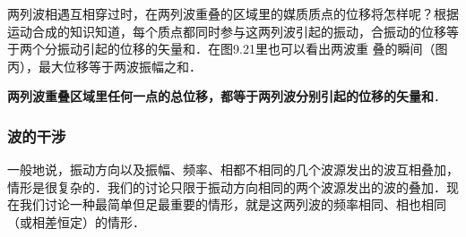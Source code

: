 两列波相遇互相穿过时，在两列波重叠的区域里的媒质质点的位移将怎样呢？根据运动合成的知识知道，每个质点都同时参与这两列波引起的振动，合振动的位移等于两个分振动引起的位移的矢量和．在图9.21里也可以看出两波重
叠的瞬间（图丙），最大位移等于两波振幅之和．

\textbf{两列波重叠区域里任何一点的总位移，都等于两列波分别引起的位移的矢量和}．

\subsubsection{波的干涉}

一般地说，振动方向以及振幅、频率、相都不相同的几个波源发出的波互相叠加，情形是很复杂的．我们的讨论只限于振动方向相同的两个波源发出的波的叠加．现在我们讨论一种最简单但足最重要的情形，就是这两列波的频率相同、相也相同（或相差恒定）的情形．

